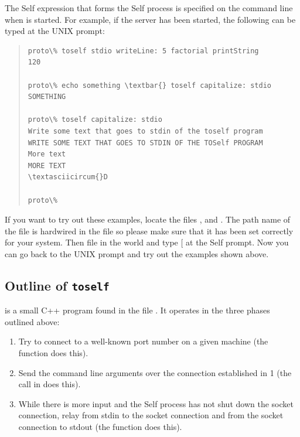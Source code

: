 \documentclass[letterpaper,10pt,english]{sphinxmanual}
\begin{document}
The Self expression that forms the Self process is specified on the command line when 
is started. For example, if the server has been started, the following can be typed at the UNIX
prompt:
\begin{quote}

\begin{Verbatim}[commandchars=\\\{\}]
proto\% toself stdio writeLine: 5 factorial printString
120

proto\% echo something \textbar{} toself capitalize: stdio
SOMETHING

proto\% toself capitalize: stdio
Write some text that goes to stdin of the toself program
WRITE SOME TEXT THAT GOES TO STDIN OF THE TOSelf PROGRAM
More text
MORE TEXT
\textasciicircum{}D

proto\%
\end{Verbatim}
\end{quote}

If you want to try out these examples, locate the files ,  and . The
path name of the file  is hardwired in the file  so please make sure that it
has been set correctly for your system. Then file in the world and type {[}\code{server start}{]}  at
the Self prompt. Now you can go back to the UNIX prompt and try out the examples shown
above.


\subsection{Outline of \texttt{toself}}
\label{vmref:outline-of-toself}
 is a small C++ program found in the file . It operates in the three phases outlined
above:
\begin{enumerate}
\item {} 
Try to connect to a well-known port number on a given machine (the function 
does this).

\item {} 
Send the command line arguments over the connection established in 1 (the 
call in  does this).

\item {} 
While there is more input and the Self process has not shut down the socket connection,
relay from stdin to the socket connection and from the socket connection to stdout (the function
 does this).

\end{enumerate}
\end{document}
